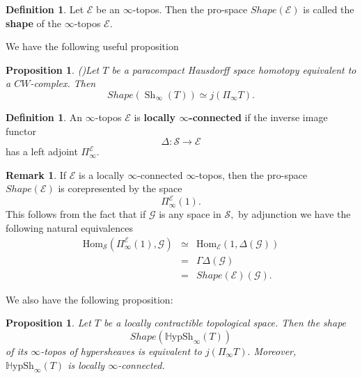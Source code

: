 \documentclass[12pt]{amsart}
\newtheorem{proposition}[dummy]{Proposition}
\theoremstyle{definition}
\newtheorem{definition}[dummy]{Definition}
\newtheorem{remark}[dummy]{Remark}
\newcommand{\cE}{\mathcal{E}}
\newcommand{\cG}{\mathcal{G}}
\newcommand{\cS}{\mathcal{S}}
\newcommand{\Sh}{\operatorname{Sh}}
\newcommand{\Hom}{\mathrm{Hom}}
\renewcommand{\i}{\infty}
\def\Shi{\Sh_\i}
\def\Hshi{\mathbb{H}\mathrm{ypSh}_\i}
\def\Shape{\mathit{Shape}}
\begin{document}
\begin{definition}\label{dfn:shape}
Let $\cE$ be an $\i$-topos. Then the pro-space $\Shape\left(\cE\right)$ is called the \textbf{shape} of the $\i$-topos $\cE.$
\end{definition}

We have the following useful proposition

\begin{proposition} (\cite[Remark A.1.4]{higheralgebra})\label{prop:shape1}
Let $T$ be a paracompact Hausdorff space homotopy equivalent to a $CW$-complex. Then $$\Shape\left(\Shi\left(T\right)\right) \simeq j\left(\Pi_\i T\right).$$
\end{proposition}

\begin{definition}
An $\i$-topos $\cE$ is \textbf{locally $\i$-connected} if the inverse image functor $$\Delta:\cS \to \cE$$ has a left adjoint $\Pi^{\cE}_\i.$
\end{definition}

\begin{remark}\label{rmk: locally infinity connected}
If $\cE$ is a locally $\i$-connected $\i$-topos, then the pro-space $\Shape\left(\cE\right)$ is corepresented by the space $$\Pi^{\cE}_\i\left(1\right).$$ This follows from the fact that if $\cG$ is any space in $\cS,$ by adjunction we have the following natural equivalences
\begin{eqnarray*}
\Hom_{\cS}\left(\Pi^{\cE}_\i\left(1\right),\cG\right) &\simeq& \Hom_{\cE}\left(1,\Delta\left(\cG\right)\right)\\
&=& \Gamma\Delta\left(\cG\right)\\
&=& \Shape\left(\cE\right)\left(\cG\right).
\end{eqnarray*}
\end{remark}


We also have the following proposition:

\begin{proposition}\label{prop: locally contractible shape}
Let $T$ be a locally contractible topological space. Then the shape $$\Shape\left(\Hshi\left(T\right)\right)$$ of its $\i$-topos of hypersheaves is equivalent to $j\left(\Pi_\i T\right).$ Moreover, $\Hshi\left(T\right)$ is locally $\i$-connected.
\end{proposition}
\end{document}
